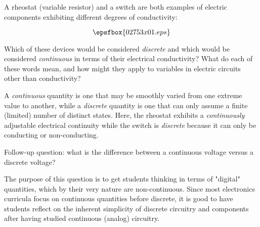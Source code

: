 

A rheostat (variable resistor) and a switch are both examples of electric components exhibiting different degrees of conductivity:

$$\epsfbox{02753x01.eps}$$

Which of these devices would be considered {\it discrete} and which would be considered {\it continuous} in terms of their electrical conductivity?  What do each of these words mean, and how might they apply to variables in electric circuits other than conductivity?







A {\it continuous} quantity is one that may be smoothly varied from one extreme value to another, while a {\it discrete} quantity is one that can only assume a finite (limited) number of distinct states.  Here, the rheostat exhibits a {\it continuously} adjustable electrical continuity while the switch is {\it discrete} because it can only be conducting or non-conducting.

\vskip 10pt

Follow-up question: what is the difference between a continuous voltage versus a discrete voltage?







The purpose of this question is to get students thinking in terms of "digital" quantities, which by their very nature are non-continuous.  Since most electronics curricula focus on continuous quantities before discrete, it is good to have students reflect on the inherent simplicity of discrete circuitry and components after having studied continuous (analog) circuitry.




